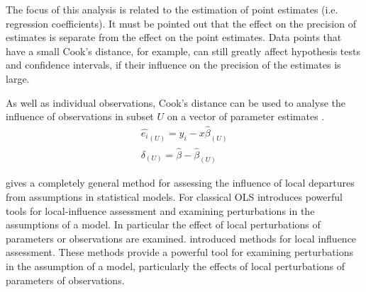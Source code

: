 \documentclass[12pt, a4paper]{report}
\theoremstyle{plain}
\theoremstyle{definition}
\theoremstyle{remark}
\begin{document}
The focus of this analysis is related to the estimation of point estimates (i.e. regression coefficients). It must be pointed out that the effect on the precision of estimates is separate from the effect on the point estimates. Data points that
have a small Cook's distance, for example, can still greatly affect hypothesis tests and confidence intervals, if their  influence on the precision of the estimates is large.

As well as individual observations, Cook's distance can be used to analyse the influence of observations in subset $U$ on a vector of parameter estimates \citep{cook77}.
\begin{eqnarray}
\hat{e_{i}}_{(U)} = y_{i} - x\hat{\beta}_{(U)}\\
\delta_{(U)} = \hat{\beta} - \hat{\beta}_{(U)}
\end{eqnarray}





\citet{cook86} gives a completely general method for assessing the influence of local departures from assumptions in statistical models.
For classical OLS \citet{cook86} introduces powerful tools for local-influence assessment and examining perturbations in the assumptions of a model. In particular the effect of local perturbations of parameters or observations are examined.
\citet{cook86} introduced methods for local influence assessment. These methods provide a powerful tool for examining perturbations in the assumption of a model, particularly the effects of local perturbations of parameters of observations.





	

\end{document}
